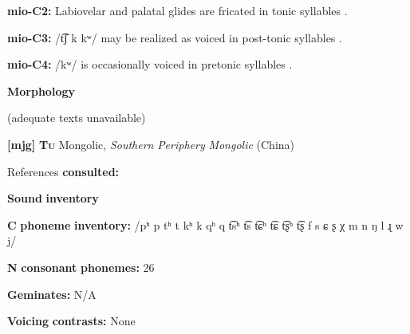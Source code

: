 \documentclass[output=paper]{langsci/langscibook}
\begin{document}
\begin{styleBody}
\textbf{mio-C2:} Labiovelar and palatal glides are fricated in tonic syllables \citep[8]{Bradley1970}.
\end{styleBody}

\begin{styleBody}
\textbf{mio-C3:} /t͡ʃ k kʷ/ may be realized as voiced in post-tonic syllables \citep[5]{Bradley1970}.
\end{styleBody}

\begin{styleBody}
\textbf{mio-C4:} /kʷ/ is occasionally voiced in pretonic syllables \citep[5]{Bradley1970}.
\end{styleBody}

\begin{styleBody}
\textbf{Morphology}
\end{styleBody}

\begin{styleBody}
(adequate texts unavailable)
\end{styleBody}

\begin{styleBody}
\textbf{[mjg]}   \textbf{\textsc{Tu}}    Mongolic, \textit{Southern} \textit{Periphery} \textit{Mongolic} (China)
\end{styleBody}

\begin{styleBody}
References \textbf{consulted:} \citet{Slater2003}
\end{styleBody}

\begin{styleBody}
\textbf{Sound} \textbf{inventory}
\end{styleBody}

\begin{styleBody}
\textbf{C} \textbf{phoneme} \textbf{inventory:} /pʰ p tʰ t kʰ k qʰ q t͡sʰ t͡s t͡ɕʰ t͡ɕ t͡ʂʰ t͡ʂ f s ɕ ʂ χ m n ŋ l ɻ w j/
\end{styleBody}

\begin{styleBody}
\textbf{N} \textbf{consonant} \textbf{phonemes:} 26
\end{styleBody}

\begin{styleBody}
\textbf{Geminates:} N/A
\end{styleBody}

\begin{styleBody}
\textbf{Voicing} \textbf{contrasts:} None
\end{styleBody}
\end{document}

